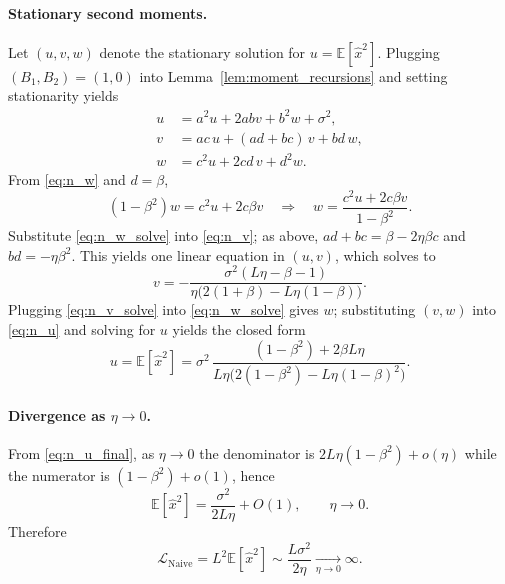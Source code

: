 \documentclass[11pt, a4paper, onecolumn, copyright, goog]{google}
\newcommand{\E}{\mathbb{E}}
\theoremstyle{plain}
\theoremstyle{definition}
\theoremstyle{remark}
\begin{document}
\paragraph{Stationary second moments.}
Let $(u,v,w)$ denote the stationary solution for $u=\E[\hat x^2]$. Plugging $(B_1,B_2)=(1,0)$ into
Lemma~\ref{lem:moment_recursions} and setting stationarity yields
\begin{align}
    u &= a^2 u + 2ab v + b^2 w + \sigma^2, \label{eq:n_u}\\
    v &= ac\,u + (ad+bc)\,v + bd\,w, \label{eq:n_v}\\
    w &= c^2 u + 2cd\,v + d^2 w. \label{eq:n_w}
\end{align}
From \eqref{eq:n_w} and $d=\beta$,
\begin{equation}
\label{eq:n_w_solve}
    (1-\beta^2)w = c^2 u + 2c\beta v
    \quad\Longrightarrow\quad
    w=\frac{c^2u + 2c\beta v}{1-\beta^2}.
\end{equation}
Substitute \eqref{eq:n_w_solve} into \eqref{eq:n_v}; as above, $ad+bc=\beta-2\eta\beta c$ and $bd=-\eta\beta^2$.
This yields one linear equation in $(u,v)$, which solves to
\begin{equation}
\label{eq:n_v_solve}
    v = -\frac{\sigma^2(L\eta-\beta-1)}{\eta\big(2(1+\beta)-L\eta(1-\beta)\big)}.
\end{equation}
Plugging \eqref{eq:n_v_solve} into \eqref{eq:n_w_solve} gives $w$; substituting $(v,w)$ into \eqref{eq:n_u} and solving
for $u$ yields the closed form
\begin{equation}
\label{eq:n_u_final}
    u=\E[\hat x^2]
    =
    \sigma^2\,
    \frac{(1-\beta^2)+2\beta L\eta}{L\eta\big(2(1-\beta^2)-L\eta(1-\beta)^2\big)}.
\end{equation}

\paragraph{Divergence as $\eta\to 0$.}
From \eqref{eq:n_u_final}, as $\eta\to 0$ the denominator is $2L\eta(1-\beta^2)+o(\eta)$ while the numerator is
$(1-\beta^2)+o(1)$, hence
\begin{equation}
\label{eq:n_asymp}
    \E[\hat x^2] = \frac{\sigma^2}{2L\eta}+O(1),
    \qquad \eta\to 0.
\end{equation}
Therefore
\begin{equation}
\label{eq:n_limit}
    \mathcal L_{\mathrm{Naive}} = L^2\E[\hat x^2]
    \sim \frac{L\sigma^2}{2\eta}
    \xrightarrow[\eta\to 0]{}\infty.
\end{equation}
\end{document}
